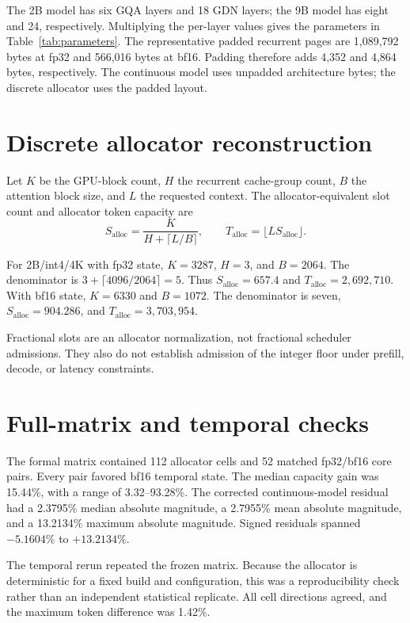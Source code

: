 \documentclass[conference,letterpaper,10pt]{IEEEtran}
\begin{document}
The 2B model has six GQA layers and 18 GDN layers; the 9B model has eight and
24, respectively. Multiplying the per-layer values gives the parameters in
Table~\ref{tab:parameters}. The representative padded recurrent pages are
1,089,792 bytes at fp32 and 566,016 bytes at bf16. Padding therefore adds
4,352 and 4,864 bytes, respectively. The continuous model uses unpadded
architecture bytes; the discrete allocator uses the padded layout.

\section{Discrete allocator reconstruction}
\label{app:discrete}

Let $K$ be the GPU-block count, $H$ the recurrent cache-group count, $B$ the
attention block size, and $L$ the requested context. The allocator-equivalent
slot count and allocator token capacity are
\begin{equation}
S_{\mathrm{alloc}}=\frac{K}{H+\lceil L/B\rceil},\qquad
T_{\mathrm{alloc}}=\lfloor L S_{\mathrm{alloc}}\rfloor.
\end{equation}

For 2B/int4/4K with fp32 state, $K=3287$, $H=3$, and $B=2064$.
The denominator is $3+\lceil4096/2064\rceil=5$. Thus
$S_{\mathrm{alloc}}=657.4$ and $T_{\mathrm{alloc}}=2{,}692{,}710$.
With bf16 state, $K=6330$ and $B=1072$. The denominator is seven,
$S_{\mathrm{alloc}}=904.286$, and
$T_{\mathrm{alloc}}=3{,}703{,}954$.

Fractional slots are an allocator normalization, not fractional scheduler
admissions. They also do not establish admission of the integer floor under
prefill, decode, or latency constraints.

\section{Full-matrix and temporal checks}
\label{app:matrix}

The formal matrix contained 112 allocator cells and 52 matched fp32/bf16 core
pairs. Every pair favored bf16 temporal state. The median capacity gain was
15.44\%, with a range of 3.32--93.28\%. The corrected continuous-model
residual had a 2.3795\% median absolute magnitude, a 2.7955\% mean absolute
magnitude, and a 13.2134\% maximum absolute magnitude. Signed residuals
spanned $-5.1604\%$ to $+13.2134\%$.

The temporal rerun repeated the frozen matrix. Because the allocator is
deterministic for a fixed build and configuration, this was a reproducibility
check rather than an independent statistical replicate. All cell directions
agreed, and the maximum token difference was 1.42\%.
\end{document}
